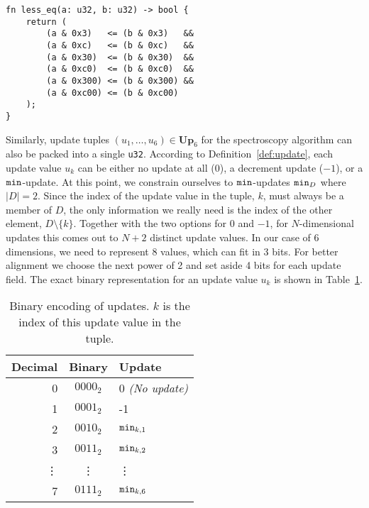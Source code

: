 \begin{lstlisting}[language=WGSL,float,
    caption={WGSL Shader Code handling bit-packed energies
        to calculate if $a \leq b$.
        This is only for the case of 6 elements with a maximum value of 3,
        other configurations will produce different shader code.
        The bitwise AND operation \texttt{a\;\&\;0x3} sets all but the 2
        least significant bits to 0,
        thus comparing just the first field.
        This is repeated with all six fields,
        where each bit mask is written in hexadecimal format.
        For example, hexadecimal C0$_{16}$ is $\ldots0\,1100\,0000_2$ in
        binary, selecting the fourth 2-bit field.
    },
    label=lst:less_eq]
fn less_eq(a: u32, b: u32) -> bool {
    return (
        (a & 0x3)   <= (b & 0x3)   &&
        (a & 0xc)   <= (b & 0xc)   &&
        (a & 0x30)  <= (b & 0x30)  &&
        (a & 0xc0)  <= (b & 0xc0)  &&
        (a & 0x300) <= (b & 0x300) &&
        (a & 0xc00) <= (b & 0xc00)
    );
}
\end{lstlisting}

Similarly, update tuples $(u_1, \ldots, u_6) \in \mathbf{Up}_6$
for the spectroscopy algorithm can also be packed into a single \texttt{u32}.
According to Definition~\ref{def:update}, each update value $u_k$ can be either
no update at all (0),
a decrement update ($-1$),
or a $\mathtt{min}$-update.
At this point, we constrain ourselves to $\mathtt{min}$-updates $\mathtt{min}_D$
where $|D| = 2$.
Since the index of the update value in the tuple, $k$,
must always be a member of $D$,
the only information we really need is the index of the other element,
$D \setminus \{k\}$.
Together with the two options for $0$ and $-1$,
for $N$-dimensional updates this comes out to $N + 2$ distinct update values.
In our case of 6 dimensions, we need to represent 8 values,
which can fit in 3 bits.
For better alignment we choose the next power
of 2 and set aside 4 bits for each update field.
The exact binary representation for an update value $u_k$ is shown in
Table~\ref{tab:update_encoding}.

\begin{table}[ht]
\centering
\caption{Binary encoding of updates. $k$ is the index of this update value in
the tuple.}\label{tab:update_encoding}
\begin{tabular}{ r c l }
    \toprule
    Decimal & Binary & Update \\
    \midrule
    0 & $0000_2$ & 0 \emph{(No update)} \\
    1 & $0001_2$ & -1 \\
    2 & $0010_2$ & $\mathtt{min}_{k, 1}$ \\
    3 & $0011_2$ & $\mathtt{min}_{k, 2}$ \\
    \vdots & \vdots & \vdots \\
    7 & $0111_2$ & $\mathtt{min}_{k, 6}$ \\
    \bottomrule
\end{tabular}
\end{table}

